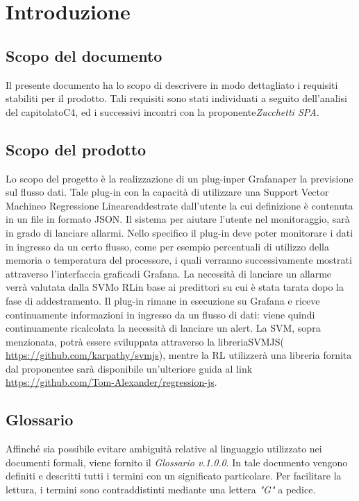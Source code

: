 \section{Introduzione}
	\subsection{Scopo del documento}
		Il presente documento ha lo scopo di descrivere in modo dettagliato i requisiti stabiliti per il prodotto. Tali requisiti sono stati individuati a seguito dell'analisi del capitolato\glo C4, ed i successivi incontri con la proponente\glo \emph{Zucchetti SPA.}

	
\subsection{Scopo del prodotto}
   Lo scopo del progetto è la realizzazione di un plug-in\glo per Grafana\glo per la previsione sul flusso dati\glo. Tale plug-in con la capacità di utilizzare una Support Vector Machine\glo o Regressione Lineare\glo addestrate dall'utente la cui definizione è contenuta in un file in formato JSON\glo. Il sistema per aiutare l’utente nel monitoraggio, sarà in grado di lanciare allarmi.
Nello specifico il plug-in deve poter monitorare i dati in ingresso da un certo flusso, come per esempio percentuali di utilizzo della memoria o temperatura del processore, i quali verranno successivamente mostrati attraverso l'interfaccia grafica\glo di Grafana.
La necessità di lanciare un allarme verrà valutata dalla SVM\glo o RL\glo in base ai predittori su cui è stata tarata dopo la fase di addestramento.
Il plug-in rimane in esecuzione su Grafana e riceve continuamente informazioni in ingresso da un flusso di dati: viene quindi continuamente ricalcolata la necessità di lanciare un alert\glo.
La SVM, sopra menzionata, potrà essere sviluppata attraverso la libreria\glo SVMJS\glo (\url{ https://github.com/karpathy/svmjs}), mentre la RL utilizzerà una libreria fornita dal proponente\glo e sarà disponibile un’ulteriore guida al link \url{https://github.com/Tom-Alexander/regression-js}.

	
	\subsection{Glossario}
		Affinché sia possibile evitare ambiguità relative al linguaggio utilizzato nei documenti formali, viene fornito il \emph{Glossario v.1.0.0}. In tale documento vengono definiti e descritti tutti i termini con un significato particolare. Per facilitare la lettura, i termini sono contraddistinti mediante una lettera \emph{"G"} a pedice.
		
